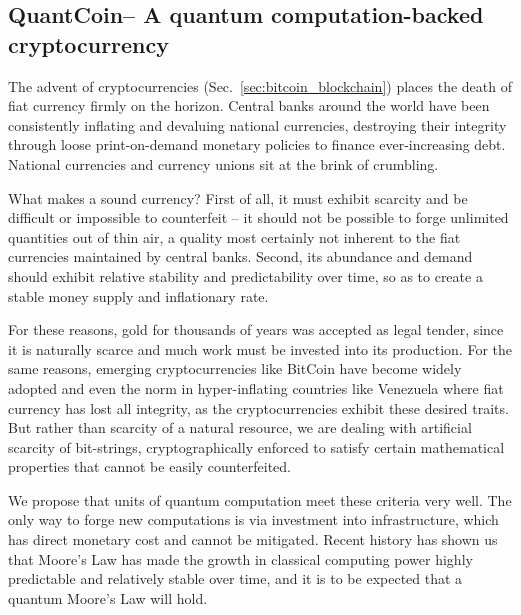 %
%

\subsection{QuantCoin\texttrademark -- A quantum computation-backed cryptocurrency}\label{sec:quantcoin}

The advent of cryptocurrencies (Sec.~\ref{sec:bitcoin_blockchain}) places the death of fiat currency firmly on the horizon. Central banks around the world have been consistently inflating and devaluing national currencies, destroying their integrity through loose print-on-demand monetary policies to finance ever-increasing debt. National currencies and currency unions sit at the brink of crumbling.

What makes a sound currency? First of all, it must exhibit scarcity and be difficult or impossible to counterfeit -- it should not be possible to forge unlimited quantities out of thin air, a quality most certainly not inherent to the fiat currencies maintained by central banks. Second, its abundance and demand should exhibit relative stability and predictability over time, so as to create a stable money supply and inflationary rate.

For these reasons, gold for thousands of years was accepted as legal tender, since it is naturally scarce and much work must be invested into its production. For the same reasons, emerging cryptocurrencies like BitCoin have become widely adopted and even the norm in hyper-inflating countries like Venezuela where fiat currency has lost all integrity, as the cryptocurrencies exhibit these desired traits. But rather than scarcity of a natural resource, we are dealing with artificial scarcity of bit-strings, cryptographically enforced to satisfy certain mathematical properties that cannot be easily counterfeited.

We propose that units of quantum computation meet these criteria very well. The only way to forge new computations is via investment into infrastructure, which has direct monetary cost and cannot be mitigated. Recent history has shown us that Moore's Law has made the growth in classical computing power highly predictable and relatively stable over time, and it is to be expected that a quantum Moore's Law will hold.

